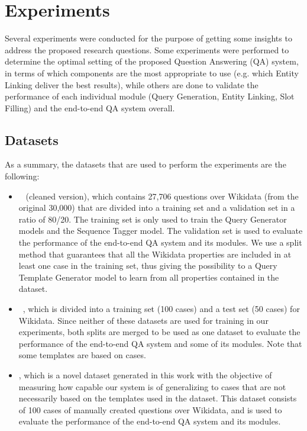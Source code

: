 \section{Experiments}
\label{cap4:experimentalDesign/experiments}
Several experiments were conducted for the purpose of getting some insights to address the 
proposed research questions. Some experiments were performed to determine the optimal setting of 
the proposed Question Answering (QA) system, in terms of which components are the most 
appropriate to use (e.g. which Entity Linking deliver the best results), while others are done 
to validate the performance of each individual module (Query Generation, Entity Linking, Slot 
Filling) and the end-to-end QA system overall.

\subsection{Datasets}
\label{cap4:experimentalDesign/datasets}
As a summary, the datasets that are used to perform the experiments are the following:

\begin{itemize}
    \item \LCQuADtwo{}~\cite{dataset:lcquad2-DubeyBA019} (cleaned version), which contains 27,706 
    questions over Wikidata (from the original 30,000) that are divided into a training set and 
    a validation set in a ratio of 80/20. The training set is only used to train the Query 
    Generator models and the Sequence Tagger model. The validation set is used to evaluate the 
    performance of the end-to-end QA system and its modules. We use a split method that 
    guarantees that all the Wikidata properties are included in at least one case in the 
    training set, thus giving the possibility to a Query Template Generator model to learn from 
    all properties contained in the dataset.
    \item \QALDseven{}~\cite{dataset:qald7-UsbeckNHKRN17}, which is divided into a training set (100 
    cases) and a test set (50 cases) for Wikidata. Since neither of these datasets are used for 
    training in our experiments, both splits are merged to be used as one dataset to evaluate 
    the performance of the end-to-end QA system and some of its modules. Note that some \LCQuADtwo{} 
    templates are based on \QALDseven{} cases.
    \item \WikiSPARQL{}, which is a novel dataset generated in this work with the objective of 
    measuring how capable our system is of generalizing to cases that are not necessarily based on 
    the templates used in the \LCQuADtwo{} dataset. This dataset consists of 100 cases of manually 
    created questions over Wikidata, and is used to evaluate the performance of the end-to-end 
    QA system and its modules.
\end{itemize}

